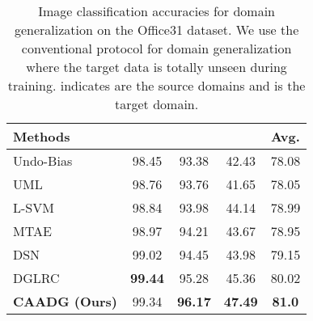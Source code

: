\documentclass[review]{elsarticle}
\begin{document}
\begin{table}[!htbp]
\fontsize{7}{8}\selectfont 
\begin{center}
\begin{tabular}{|l||c|c|c||c|}
\hline

\textbf{Methods} & \textbf{} & \textbf{} & \textbf{} &  \textbf{Avg.}\\
\hline\hline

Undo-Bias \cite{Khosla:2012:UDD:2402940.2402953}    &98.45 &93.38  &42.43   &78.08   \\

UML \cite{6751316}  &98.76 &93.76  &41.65   &78.05   \\

L-SVM \cite{DBLP:journals/jmlr/FanCHWL08}  &98.84  &93.98  &44.14   &78.99   \\

MTAE \cite{DBLP:conf/iccv/GhifaryKZB15}  &98.97  &94.21  &43.67   &78.95  \\


DSN \cite{Bousmalis:2016:DSN:3157096.3157135} &99.02  &94.45  &43.98   &79.15  \\

DGLRC  \cite{8053784} & \textbf{99.44}  &95.28  &45.36   &80.02   \\


\hline
\hline
\textbf{CAADG (Ours)}  &99.34 &\textbf{96.17}  & \textbf{47.49}  & \textbf{81.0}\\
\hline
\end{tabular}
\end{center}
\caption{Image classification accuracies for domain generalization on the Office31 dataset. We use the conventional protocol for domain generalization where the target data is totally unseen during training.  indicates  are the source domains and  is the target domain.}
\label{Off31_DG}
\end{table}
\end{document}
